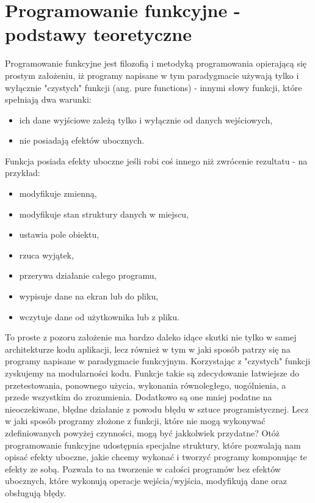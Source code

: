 \documentclass[../main.tex]{subfiles}
\begin{document}
\section{Programowanie funkcyjne - podstawy teoretyczne}
Programowanie funkcyjne jest filozofią i metodyką programowania opierającą się prostym założeniu, iż programy napisane w tym paradygmacie używają tylko i wyłącznie "czystych" funkcji (ang. pure functions) \cite{BOOK:FPinScala} - innymi słowy funkcji, które spełniają dwa warunki: 
\begin{itemize}
\item ich dane wyjściowe zależą tylko i wyłącznie od danych wejściowych,
\item nie posiadają efektów ubocznych.
\end{itemize}
\vspace{3ex}
Funkcja posiada efekty uboczne jeśli robi coś innego niż zwrócenie rezultatu - na przykład: 
\begin{itemize}
    \item modyfikuje zmienną,
    \item modyfikuje stan struktury danych w miejscu,
    \item ustawia pole obiektu,
    \item rzuca wyjątek,
    \item przerywa działanie całego programu,
    \item wypisuje dane na ekran lub do pliku,
    \item wczytuje dane od użytkownika lub z pliku.
\end{itemize}
\vspace{3ex}
To proste z pozoru założenie ma bardzo daleko idące skutki nie tylko w samej architekturze kodu aplikacji, lecz również w tym w jaki sposób patrzy się na programy napisane w paradygmacie funkcyjnym.\newline\newline
Korzystając z "czystych" funkcji zyskujemy na modularności kodu. Funkcje takie są zdecydowanie łatwiejsze do przetestowania, ponownego użycia, wykonania równoległego, uogólnienia, a przede wszystkim do zrozumienia. Dodatkowo są one mniej podatne na nieoczekiwane, błędne działanie z powodu błędu w sztuce programistycznej.\newline\newline
Lecz w jaki sposób programy złożone z funkcji, które nie mogą wykonywać zdefiniowanych powyżej czynności, mogą być jakkolwiek przydatne? 
Otóż programowanie funkcyjne udostępnia specjalne struktury, które pozwalają nam opisać efekty uboczne, jakie chcemy wykonać i tworzyć programy komponując te efekty ze sobą. Pozwala to na tworzenie w całości programów bez efektów ubocznych, które wykonują operacje wejścia/wyjścia, modyfikują dane oraz obsługują błędy.
\end{document}
